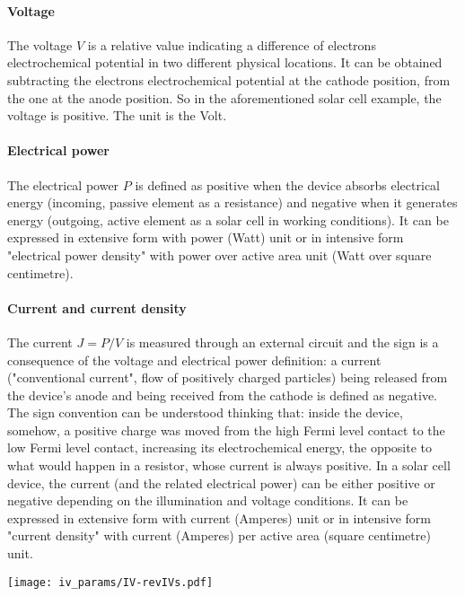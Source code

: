 		\paragraph{Voltage}
		The voltage $V$ is a relative value indicating a difference of electrons electrochemical potential in two different physical locations.
		It can be obtained subtracting the electrons electrochemical potential at the cathode position, from the one at the anode position.
		So in the aforementioned solar cell example, the voltage is positive.
		The unit is the Volt.

		\paragraph{Electrical power}
		The electrical power $P$ is defined as positive when the device absorbs electrical energy (incoming, passive element as a resistance) and negative when it generates energy (outgoing, active element as a solar cell in working conditions).
		It can be expressed in extensive form with power (Watt) unit or in intensive form "electrical power density" with power over active area unit (Watt over square centimetre).

		\paragraph{Current and current density}
		The current $J=P/V$ is measured through an external circuit and the sign is a consequence of the voltage and electrical power definition: a current ("conventional current", flow of positively charged particles) being released from the device's anode and being received from the cathode is defined as negative.
		The sign convention can be understood thinking that: inside the device, somehow, a positive charge was moved from the high Fermi level contact to the low Fermi level contact, increasing its electrochemical energy, the opposite to what would happen in a resistor, whose current is always positive.
		In a solar cell device, the current (and the related electrical power) can be either positive or negative depending on the illumination and voltage conditions.
		It can be expressed in extensive form with current (Amperes) unit or in intensive form "current density" with current (Amperes) per active area (square centimetre) unit.

		\begin{SCfigure}
			\centering
			\texttt{[image: iv\_params/IV-revIVs.pdf]}
			\label{fig:iv_params}
		\end{SCfigure}

